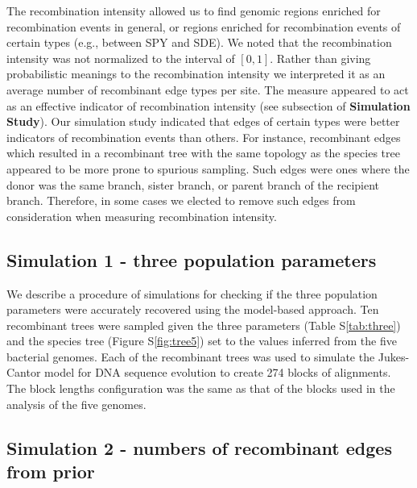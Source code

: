 \documentclass[10pt]{article}
\begin{document}
The recombination intensity allowed us to find genomic regions enriched for
recombination events in general, or regions enriched for recombination events of
certain types (e.g., between SPY and SDE).  We noted that the recombination
intensity was not normalized to the interval of $[0,1]$. Rather than giving
probabilistic meanings to the recombination intensity we interpreted it as an
average number of recombinant edge types per site.  The measure appeared to act
as an effective indicator of recombination intensity (see subsection of
\textbf{Simulation Study}).  Our simulation study indicated that edges of
certain types were better indicators of recombination events than others.  For
instance, recombinant edges which resulted in a recombinant tree with the same
topology as the species tree appeared to be more prone to spurious sampling.
Such edges were ones where the donor was the same branch, sister branch, or
parent branch of the recipient branch.  Therefore, in some cases we elected to
remove such edges from consideration when measuring recombination intensity.  

\subsection{Simulation 1 - three population parameters}

We describe a procedure of simulations for checking if the three
population parameters were accurately recovered using the model-based approach.
Ten recombinant trees were sampled given the three parameters (Table
S\ref{tab:three}) and the species tree (Figure S\ref{fig:tree5}) set to the
values inferred from the five bacterial genomes.  Each of the recombinant trees
was used to simulate the Jukes-Cantor model for DNA sequence evolution to create
274 blocks of alignments.  The block lengths configuration was the same as that
of the blocks used in the analysis of the five genomes.  


\subsection{Simulation 2 - numbers of recombinant edges from prior}
\end{document}
